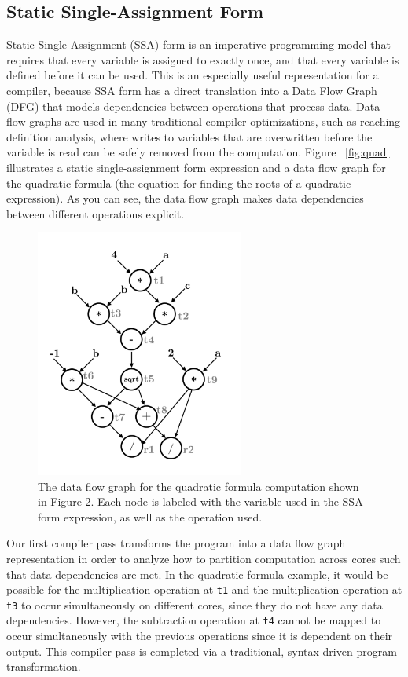 \documentclass{sig-alternate-05-2015}
\begin{document}
\subsection{Static Single-Assignment Form}
Static-Single Assignment (SSA) form is an imperative programming model that requires that every variable is assigned to exactly once, and that every variable is defined before it can be used. This is an especially useful representation for a compiler, because SSA form has a direct translation into a Data Flow Graph (DFG) that models dependencies between operations that process data. Data flow graphs are used in many traditional compiler optimizations, such as reaching definition analysis, where writes to variables that are overwritten before the variable is read can be safely removed from the computation. Figure ~\ref{fig:quad} illustrates a static single-assignment form expression and a data flow graph for the quadratic formula (the equation for finding the roots of a quadratic expression). As you can see, the data flow graph makes data dependencies between different operations explicit. 

\begin{figure}
\centering
\includegraphics[width=2.7in]{data-flow.png}
\caption{The data flow graph for the quadratic formula computation shown in Figure 2. Each node is labeled with the variable used in the SSA form expression, as well as the operation used.}
\end{figure}

Our first compiler pass transforms the program into a data flow graph representation in order to analyze how to partition computation across cores such that data dependencies are met. In the quadratic formula example, it would be possible for the multiplication operation at \texttt{t1} and the multiplication operation at \texttt{t3} to occur simultaneously on different cores, since they do not have any data dependencies. However, the subtraction operation at \texttt{t4} cannot be mapped to occur simultaneously with the previous operations since it is dependent on their output. This compiler pass is completed via a traditional, syntax-driven program transformation. 
\end{document}
